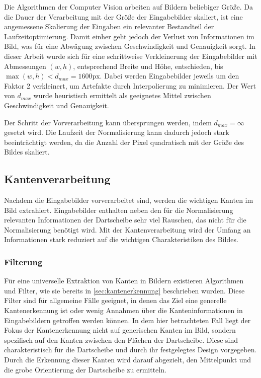 Die Algorithmen der Computer Vision arbeiten auf Bildern beliebiger Größe. Da die Dauer der Verarbeitung mit der Größe der Eingabebilder skaliert, ist eine angemessene Skalierung der Eingaben ein relevanter Bestandteil der Laufzeitoptimierung. Damit einher geht jedoch der Verlust von Informationen im Bild, was für eine Abwägung zwischen Geschwindigkeit und Genauigkeit sorgt. In dieser Arbeit wurde sich für eine schrittweise Verkleinerung der Eingabebilder mit Abmessungen $(w, h)$, entsprechend Breite und Höhe, entschieden, bis $\max (w, h) < d_{max} = 1600\text{px}$. Dabei werden Eingabebilder jeweils um den Faktor 2 verkleinert, um Artefakte durch Interpolierung zu minimieren. Der Wert von $d_{max}$ wurde heuristisch ermittelt als geeignetes Mittel zwischen Geschwindigkeit und Genauigkeit.

Der Schritt der Vorverarbeitung kann übersprungen werden, indem $d_{max} = \infty$ gesetzt wird. Die Laufzeit der Normalisierung kann dadurch jedoch stark beeinträchtigt werden, da die Anzahl der Pixel quadratisch mit der Größe des Bildes skaliert.

\subsection{Kantenverarbeitung}
\label{sec:kanten}

Nachdem die Eingabebilder vorverarbeitet sind, werden die wichtigen Kanten im Bild extrahiert. Eingabebilder enthalten neben den für die Normalisierung relevanten Informationen der Dartscheibe sehr viel Rauschen, das nicht für die Normalisierung benötigt wird. Mit der Kantenverarbeitung wird der Umfang an Informationen stark reduziert auf die wichtigen Charakteristiken des Bildes.

\subsubsection{Filterung}
\label{sec:filterung}

Für eine universelle Extraktion von Kanten in Bildern existieren Algorithmen und Filter, wie sie bereits in \autoref{sec:kantenerkennung} beschrieben wurden. Diese Filter sind für allgemeine Fälle geeignet, in denen das Ziel eine generelle Kantenerkennung ist oder wenig Annahmen über die Kanteninformationen in Eingabebildern getroffen werden können. In dem hier betrachteten Fall liegt der Fokus der Kantenerkennung nicht auf generischen Kanten im Bild, sondern spezifisch auf den Kanten zwischen den Flächen der Dartscheibe. Diese sind charakteristisch für die Dartscheibe und durch ihr festgelegtes Design vorgegeben. Durch die Erkennung dieser Kanten wird darauf abgezielt, den Mittelpunkt und die grobe Orientierung der Dartscheibe zu ermitteln.

